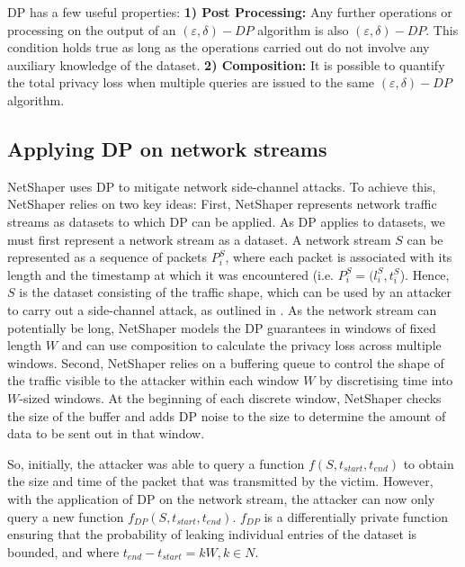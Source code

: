 DP has a few useful properties: 
\textbf{1) Post Processing:} Any further operations or processing on the output of an $(\varepsilon, \delta)-DP$ algorithm is also $(\varepsilon, \delta)-DP$.
This condition holds true as long as the operations carried out do not involve any auxiliary knowledge of the dataset.
\textbf{2) Composition:} It is possible to quantify the total privacy loss when multiple queries are issued to the same $(\varepsilon, \delta)-DP$ algorithm.

\subsection{Applying DP on network streams}
\label{subsec:applying-dp-on-network-streams-bg}
NetShaper uses DP to mitigate network side-channel attacks. 
To achieve this, NetShaper relies on two key ideas: 
First, NetShaper represents network traffic streams as datasets to which DP can be applied.
As DP applies to datasets, we must first represent a network stream as a dataset.
A network stream $S$ can be represented as a sequence of packets $P_i^S$, where each packet is associated with its length and the timestamp at which it was encountered (i.e. $P_i^S = (l_i^S, t_i^S$).
Hence, $S$ is the dataset consisting of the traffic shape, which can be used by an attacker to carry out a side-channel attack, as outlined in .
As the network stream can potentially be long, NetShaper models the DP guarantees in windows of fixed length $W$ and can use composition to calculate the privacy loss across multiple windows.
Second, NetShaper relies on a buffering queue to control the shape of the traffic visible to the attacker within each window $W$ by discretising time into $W$-sized windows.
At the beginning of each discrete window, NetShaper checks the size of the buffer and adds DP noise to the size to determine the amount of data to be sent out in that window.


So, initially, the attacker was able to query a function $f(S, t_{start}, t_{end})$ to obtain the size and time of the packet that was transmitted by the victim. 
However, with the application of DP on the network stream, the attacker can now only query a new function $f_{DP}(S, t_{start}, t_{end})$.
$f_{DP}$ is a differentially private function ensuring that the probability of leaking individual entries of the dataset is bounded, and where $t_{end} - t_{start} = kW, k \in N$.

\endinput

Note: Should we add stuff about sensitivity? (I don't think it's necessary for my thesis)